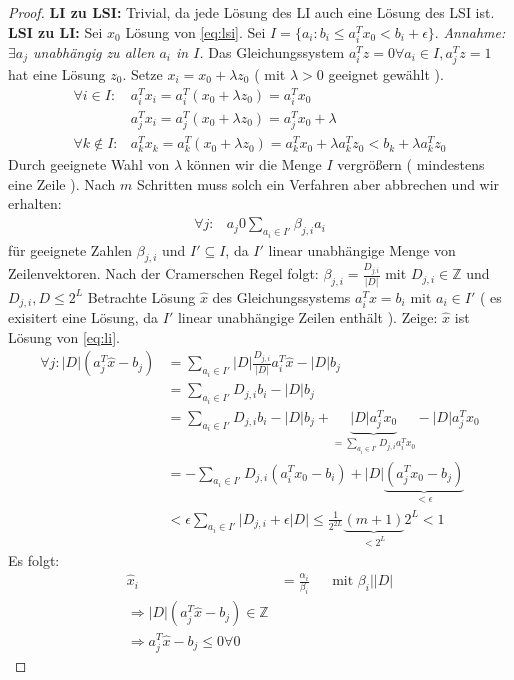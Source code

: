\begin{proof}
\textbf{LI zu LSI:} Trivial, da jede Lösung des LI auch eine Lösung des LSI ist.\newline
\textbf{LSI zu LI:}
Sei $x_0$ Lösung von \eqref{eq:lsi}. Sei $I = \{ a_i :  b_i \leq a_i^Tx_0 < b_i + \epsilon \}$.\newline
\emph{Annahme: $\exists a_j$ unabhängig zu allen $a_i$ in $I$.}\newline
Das Gleichungssystem $a_i^T z = 0 \forall a_i \in I, a_j^Tz = 1$ hat eine Lösung $z_0$. Setze $x_i = x_0 + \lambda z_0$ ( mit $\lambda >0$ geeignet gewählt ).
\begin{align*}
\forall i \in I: &a_i^T x_i = a_i^T( x_0 + \lambda z_0) = a_i^Tx_0\\
&a_j^Tx_i = a_j^T(x_0 + \lambda z_0) = a_j^Tx_0 + \lambda \\
\forall k \notin I: & a_k^Tx_k = a_k^T(x_0 + \lambda z_0) = a_k^Tx_0 + \lambda a_k^T z_0 < b_k + \lambda a_k^T z_0
\end{align*}
Durch geeignete Wahl von $\lambda$ können wir die Menge $I$ vergrößern ( mindestens eine Zeile ). Nach $m$ Schritten muss solch ein Verfahren aber abbrechen und wir erhalten:
\begin{align*}
\forall j : & a_j 0 \sum_{a_i \in I'} \beta_{j,i} a_i
\end{align*}
für geeignete Zahlen $\beta_{j,i}$ und $I' \subseteq I$, da $I'$ linear unabhängige Menge von Zeilenvektoren.
Nach der Cramerschen Regel folgt: $\beta_{j,i} = \frac{D_{j.i}}{\lvert D \rvert}$ mit $D_{j,i} \in \mathbb Z$ und $D_{j,i}, D \leq 2^{L}$
Betrachte Lösung $\hat{x}$ des Gleichungssystems $a_i^Tx=b_i$ mit $a_i \in I'$ ( es exisitert eine Lösung, da $I'$ linear unabhängige Zeilen enthält ).
\newline\newline
Zeige: $\hat{x}$ ist Lösung von \eqref{eq:li}.
\begin{align*}
\forall j: \lvert D \rvert ( a_j^T \hat{x} - b_j ) &= \sum_{a_i \in I'} \lvert D \rvert \frac{D_{j,i}}{\lvert D \rvert} a_i^T\hat{x} - \lvert D \rvert b_j \\
&= \sum_{a_i \in I'} D_{j,i} b_i - \lvert D \rvert b_j \\
&= \sum_{a_i \in I'} D_{j,i} b_i - \lvert D \rvert b_j + \underbrace{\lvert D \rvert a_j^Tx_0}_{=\sum_{a_i\in I'} D_{j,i}a_i^Tx_0 } - \lvert D \rvert a_j^Tx_0 \\
&= -\sum_{a_i \in I'} D_{j,i} (a_i^T x_0 - b_i ) + \lvert D \rvert \underbrace{( a_j^Tx_0 - b_j)}_{< \epsilon} \\
&< \epsilon \sum_{a_i \in I'} \lvert D_{j,i} + \epsilon \lvert D \rvert \leq \frac{1}{2^{2L}} \underbrace{(m+1)}_{<2^L} 2^L < 1
\end{align*}
Es folgt:
\begin{align*}
\hat{x}_i &= \frac{\alpha_i}{\beta_i} && \text{mit } \beta_i | \lvert D \rvert \\
\Rightarrow \lvert D \rvert (a_j^T\hat{x}-b_j) \in \mathbb Z \\
\Rightarrow a_j^T\hat{x} - b_j \leq 0 \forall 0
\end{align*}
\end{proof}

